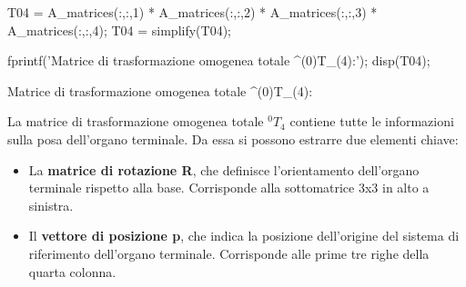 \documentclass[11pt, a4paper]{article}
\begin{document}
\begin{matlabcode}

T04 = A_matrices(:,:,1) * A_matrices(:,:,2) * A_matrices(:,:,3) * A_matrices(:,:,4);
T04 = simplify(T04);

fprintf('Matrice di trasformazione omogenea totale ^(0)T_(4):\n');
disp(T04);
\end{matlabcode}
\begin{matlaboutput}
Matrice di trasformazione omogenea totale ^(0)T_(4):
\end{matlaboutput}
\begin{par}
\begin{flushleft}
La matrice di trasformazione omogenea totale $^0 T_4$ contiene tutte le informazioni sulla posa dell'organo terminale. Da essa si possono estrarre due elementi chiave:
\end{flushleft}
\end{par}

\begin{itemize}
   \item La \textbf{matrice di rotazione R}, che definisce l'orientamento dell'organo terminale rispetto alla base. Corrisponde alla sottomatrice 3x3 in alto a sinistra.
   \item Il \textbf{vettore di posizione p}, che indica la posizione dell'origine del sistema di riferimento dell'organo terminale. Corrisponde alle prime tre righe della quarta colonna.
\end{itemize}
\end{document}
